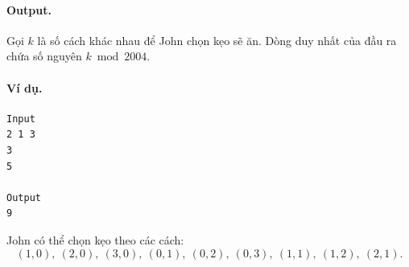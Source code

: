 \documentclass[11pt]{article}
\begin{document}
\paragraph{Output.}
Gọi \(k\) là số cách khác nhau để John chọn kẹo sẽ ăn. Dòng duy nhất của đầu
ra chứa số nguyên \(k\bmod 2004\).

\paragraph{Ví dụ.}
\begin{verbatim}
Input
2 1 3
3
5

Output
9
\end{verbatim}

John có thể chọn kẹo theo các cách:
\[
  (1,0),\ (2,0),\ (3,0),\ (0,1),\ (0,2),\ (0,3),\ (1,1),\ (1,2),\ (2,1).
\]
\end{document}
